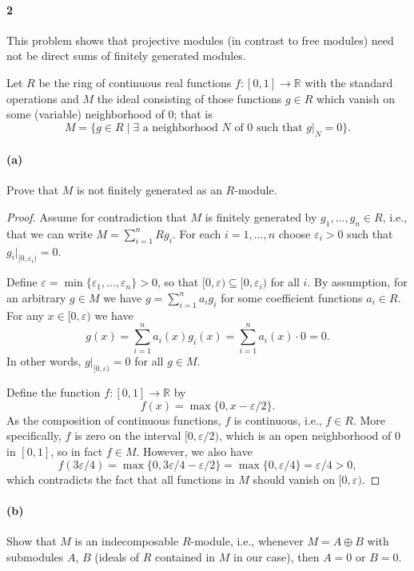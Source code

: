 \documentclass[12pt]{article}
\newlength{\myparskip}
\newenvironment{fullbox}{\begin{lrbox}{\savefullbox}\begin{minipage}{\dimexpr\textwidth-2\fboxsep\relax}\setlength{\parskip}{\myparskip}}{\end{minipage}\end{lrbox}\framebox[\textwidth]{\usebox{\savefullbox}}}
\newenvironment{pbox}[1][]{\begin{fullbox}\def\temp{#1}\ifx\temp\empty\else\paragraph{#1}\phantom{}\fi}{\end{fullbox}}
\theoremstyle{definition}
\newcommand{\R}{\mathbb{R}}
\newcommand{\eps}{\varepsilon}
\newcommand{\<}{\langle}
\renewcommand{\>}{\rangle}
\newcommand{\seq}{\subseteq}
\renewcommand{\_}[1]{{_{#1}}}
\begin{document}
\newpage
\begin{pbox}[2]
    This problem shows that projective modules (in contrast to free modules) need not be direct sums of finitely generated modules.

    Let $R$ be the ring of continuous real functions $f : [0, 1] \to \R$ with the standard operations and $M$ the ideal consisting of those functions $g \in R$ which vanish on some (variable) neighborhood of $0$; that is
    \[
        M = \{g \in R \mid \exists\text{ a neighborhood $N$ of $0$ such that } g|_N = 0\}. 
    \]
\end{pbox}

\begin{pbox}[(a)]
    Prove that $M$ is not finitely generated as an $R$-module.
\end{pbox}

\begin{proof}
    Assume for contradiction that $M$ is finitely generated by $g_1, \dots, g_n \in R$, i.e., that we can write $M = \sum_{i=1}^{n} Rg_i$.
    For each $i = 1, \dots, n$ choose $\eps_i > 0$ such that $g_i|_{[0, \eps_i)} = 0$.
    
    Define $\eps = \min\{\eps_1, \dots, \eps_n\} > 0$, so that $[0, \eps) \seq [0, \eps_i)$ for all $i$.
    By assumption, for an arbitrary $g \in M$ we have $g = \sum_{i=1}^{n} a_i g_i$ for some coefficient functions $a_i \in R$.
    For any $x \in [0, \eps)$ we have
    \[
        g(x)
            = \sum_{i=1}^{n} a_i(x) g_i(x)
            = \sum_{i=1}^{n} a_i(x) \cdot 0
            = 0.
    \]
    In other words, $g|_{[0, \eps)} = 0$ for all $g \in M$.

    Define the function $f : [0, 1] \to \R$ by
    \[
        f(x) = \max\{0, x - \eps/2\}.
    \]
    As the composition of continuous functions, $f$ is continuous, i.e., $f \in R$.
    More specifically, $f$ is zero on the interval $[0, \eps/2)$, which is an open neighborhood of $0$ in $[0, 1]$, so in fact $f \in M$.
    However, we also have
    \[
        f(3\eps/4)
            = \max\{0, 3\eps/4 - \eps/2\}
            = \max\{0, \eps/4\}
            = \eps/4 
            > 0,
    \]
    which contradicts the fact that all functions in $M$ should vanish on $[0, \eps)$.
\end{proof}

\begin{pbox}[(b)]
    Show that $M$ is an indecomposable $R$-module, i.e., whenever $M = A \oplus B$ with submodules $A$, $B$ (ideals of $R$ contained in $M$ in our case), then $A = 0$ or $B = 0$.
\end{pbox}
\end{document}
